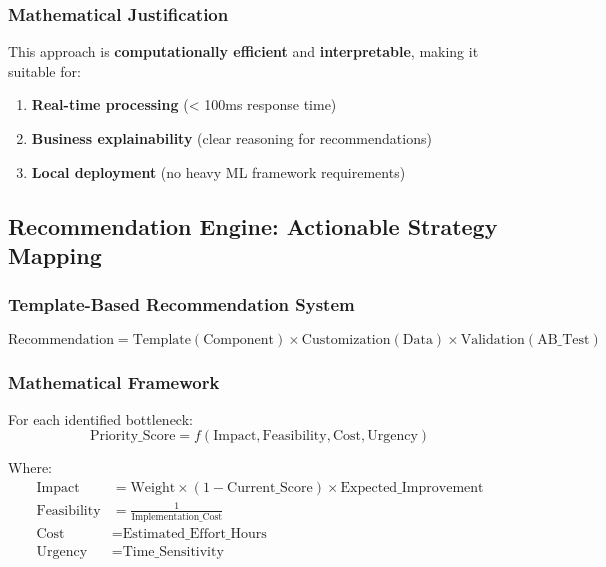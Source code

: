 \documentclass[12pt,a4paper]{article}
\begin{document}
\subsubsection{Mathematical Justification}

This approach is \textbf{computationally efficient} and \textbf{interpretable}, making it suitable for:
\begin{enumerate}
\item \textbf{Real-time processing} (< 100ms response time)
\item \textbf{Business explainability} (clear reasoning for recommendations)
\item \textbf{Local deployment} (no heavy ML framework requirements)
\end{enumerate}

\subsection{Recommendation Engine: Actionable Strategy Mapping}

\subsubsection{Template-Based Recommendation System}

\begin{equation}
\text{Recommendation} = \text{Template}(\text{Component}) \times \text{Customization}(\text{Data}) \times \text{Validation}(\text{AB\_Test})
\end{equation}

\subsubsection{Mathematical Framework}

For each identified bottleneck:
\begin{equation}
\text{Priority\_Score} = f(\text{Impact}, \text{Feasibility}, \text{Cost}, \text{Urgency})
\end{equation}

Where:
\begin{align}
\text{Impact} &= \text{Weight} \times (1 - \text{Current\_Score}) \times \text{Expected\_Improvement} \\
\text{Feasibility} &= \frac{1}{\text{Implementation\_Cost}} \\
\text{Cost} &= \text{Estimated\_Effort\_Hours} \\
\text{Urgency} &= \text{Time\_Sensitivity}
\end{align}
\end{document}
